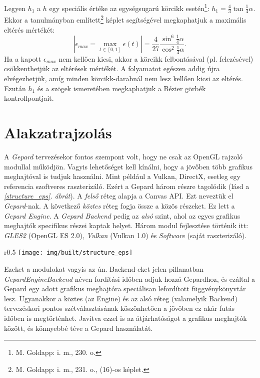 \documentclass[12pt]{report}
\theoremstyle{definition}
\newcommand{\func}[1]{{\textsl{#1}}}
\newcommand{\melyikoldalra}{r}
\begin{document}
Legyen $h_1$ a $h$ egy speciális értéke az egységsugarú körcikk
esetén\footnote{M. Goldapp: i. m., 230. o.}: $h_1 = \frac{4}{3} \tan{\frac{1}{4}
\alpha}$. Ekkor a \cite[Goldapp]{Goldapp:1991:approximation} tanulmányban
említett\footnote{M.  Goldapp: i. m., 231. o., (16)-os képlet.} képlet
segítségével megkaphatjuk a maximális eltérés mértékét: \begin{equation}
\label{eq:2} |\epsilon_{max} = \max_{{t\in[0, 1]}} \epsilon(t)| = \frac{4}{27}
\frac{\sin^6{\frac{1}{4} \alpha}}{\cos^2{\frac{1}{4} \alpha}}. \end{equation} Ha
a kapott $\epsilon_{max}$ nem kellően kicsi, akkor a körcikk felbontásával (pl.
felezésével) csökkenthetjük az eltérések mértékét. A folyamatot egészen addig
újra elvégezhetjük, amíg minden körcikk-darabnál nem lesz kellően kicsi az
eltérés. Ezután $h_1$ és a szögek ismeretében megkaphatjuk a Bézier görbék
kontrollpontjait.



    \chapter{Alakzatrajzolás}

A \emph{Gepard} tervezésekor fontos szempont volt, hogy ne csak az OpenGL
rajzoló modullal működjön. Vagyis lehetőséget kell kínálni, hogy a jövőben több
grafikus meghajtóval is tudjuk használni. Mint például a Vulkan, DirectX,
esetleg egy referencia szoftveres raszterizáló. Ezért a Gepard három részre
tagolódik (lásd a \emph{\ref{structure_eps}. ábrát}). A \emph{felső} réteg
alapja a Canvas API. Ezt neveztük el \emph{Gepard}-nak. A következő
\emph{köztes} réteg fogja össze a közös részeket. Ez lett a \emph{Gepard
Engine}. A \emph{Gepard Backend} pedig az \emph{alsó} szint, ahol az egyes
grafikus meghajtók specifikus részei kaptak helyet. Három modul fejlesztése
történik itt: \emph{GLES2} (OpenGL ES 2.0), \emph{Vulkan} (Vulkan 1.0) és
\emph{Software} (saját raszterizáló).
  \begin{wrapfigure}{\melyikoldalra}{0.5\textwidth}
    \texttt{[image: img/built/structure\_eps]}
    \caption{\label{structure_eps} A három fő réteg}
  \end{wrapfigure}
Ezeket a modulokat vagyis az ún. Backend-eket jelen pillanatban
\func{GepardEngineBackend} néven fordítási időben adjuk hozzá Gepardhoz, és
ezáltal a Gepard egy adott grafikus meghajtóra speciálisan lefordított
függvénykönyvtár lesz. Ugyanakkor a köztes (az Engine) és az alsó réteg
(valamelyik Backend) tervezéskori pontos szétválasztásának köszönhetően a
jövőben ez akár futás időben is megtörténhet. Javítva ezzel is az átjárhatóságot
a grafikus meghajtók között, és könnyebbé téve a Gepard használatát.
\end{document}
